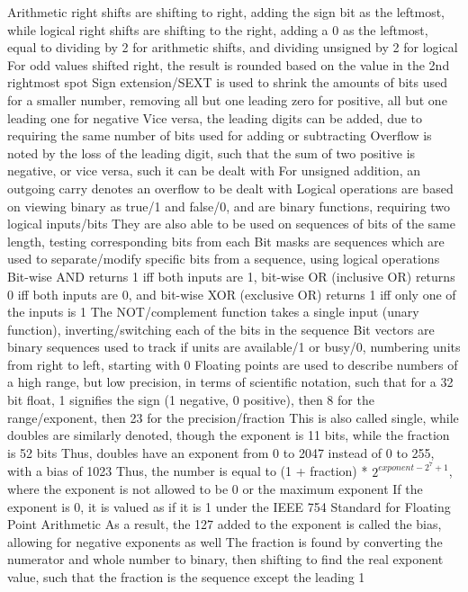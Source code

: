 \documentclass[11 pt, twoside]{article}
\newenvironment{outline*}
{
	\begin{outline}[enumerate]
	}
	{\end{outline}
}
\begin{document}
\begin{outline*}
\2 Arithmetic right shifts are shifting to right, adding the sign bit as the leftmost, while logical right shifts are shifting to the right, adding a 0 as the leftmost, equal to dividing by 2 for arithmetic shifts, and dividing unsigned by 2 for logical
\3 For odd values shifted right, the result is rounded based on the value in the 2nd rightmost spot
\2 Sign extension/SEXT is used to shrink the amounts of bits used for a smaller number, removing all but one leading zero for positive, all but one leading one for negative
\3 Vice versa, the leading digits can be added, due to requiring the same number of bits used for adding or subtracting
\2 Overflow is noted by the loss of the leading digit, such that the sum of two positive is negative, or vice versa, such it can be dealt with
\3 For unsigned addition, an outgoing carry denotes an overflow to be dealt with
\1 Logical operations are based on viewing binary as true/1 and false/0, and are binary functions, requiring two logical inputs/bits
\2 They are also able to be used on sequences of bits of the same length, testing corresponding bits from each
\3 Bit masks are sequences which are used to separate/modify specific bits from a sequence, using logical operations
\2 Bit-wise AND returns 1 iff both inputs are 1, bit-wise OR (inclusive OR) returns 0 iff both inputs are 0, and bit-wise XOR (exclusive OR) returns 1 iff only one of the inputs is 1
\2 The NOT/complement function takes a single input (unary function), inverting/switching each of the bits in the sequence
\1 Bit vectors are binary sequences used to track if units are available/1 or busy/0, numbering units from right to left, starting with 0
\1 Floating points are used to describe numbers of a high range, but low precision, in terms of scientific notation, such that for a 32 bit float, 1 signifies the sign (1 negative, 0 positive), then 8 for the range/exponent, then 23 for the precision/fraction
\2 This is also called single, while doubles are similarly denoted, though the exponent is 11 bits, while the fraction is 52 bits
\3 Thus, doubles have an exponent from 0 to 2047 instead of 0 to 255, with a bias of 1023
\2 Thus, the number is equal to (1 + fraction) * $2^{exponent - 2^7 + 1}$, where the exponent is not allowed to be 0 or the maximum exponent
\3 If the exponent is 0, it is valued as if it is 1 under the IEEE 754 Standard for Floating Point Arithmetic
\3 As a result, the 127 added to the exponent is called the bias, allowing for negative exponents as well
\2 The fraction is found by converting the numerator and whole number to binary, then shifting to find the real exponent value, such that the fraction is the sequence except the leading 1

\end{outline*}
\end{document}
